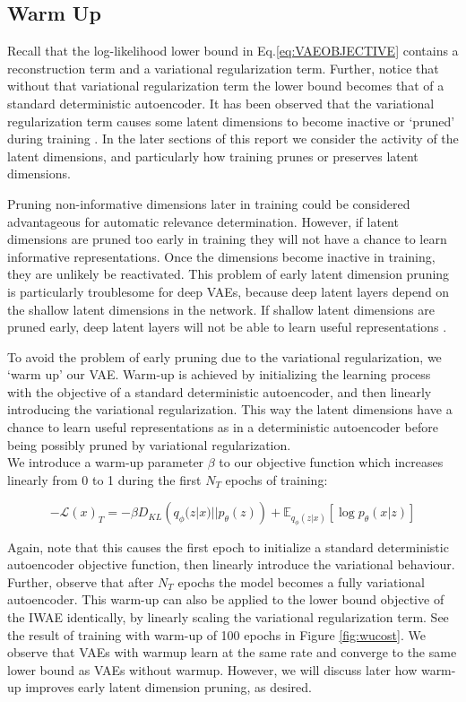 \documentclass{article} %
\numberwithin{figure}{section}
\renewcommand{\L}{\mathcal{L}}
\begin{document}
\subsection{Warm Up}
Recall that the log-likelihood lower bound in Eq.\ref{eq:VAEOBJECTIVE} contains a reconstruction term and a variational regularization term. Further, notice that without that variational regularization term the lower bound becomes that of a standard deterministic autoencoder. It has been observed that the variational regularization term causes some latent dimensions to become inactive or `pruned' during training \cite{MacKay2001, Burda2016}. In the later sections of this report we consider the activity of the latent dimensions, and particularly how training prunes or preserves latent dimensions.
\par Pruning non-informative dimensions later in training could be considered advantageous for automatic relevance determination. However, if latent dimensions are pruned too early in training they will not have a chance to learn informative representations. Once the dimensions become inactive in training, they are unlikely be reactivated. This problem of early latent dimension pruning is particularly troublesome for deep VAEs, because deep latent layers depend on the shallow latent dimensions in the network. If shallow latent dimensions are pruned early,  deep latent layers will not be able to learn useful representations \cite{Sonderby2016}.
\par To avoid the problem of early pruning due to the variational regularization, we `warm up' our VAE. Warm-up is achieved by initializing the learning process with the objective of a standard deterministic autoencoder, and then linearly introducing the variational regularization. This way the latent dimensions have a chance to learn useful representations as in a deterministic autoencoder before being possibly pruned by variational regularization.\\ We introduce a warm-up parameter $\beta$ to our objective function which increases linearly from 0 to 1 during the first $N_T$ epochs of training:

\begin{equation}
    -\L(x)_T=-\beta D_{KL}\left(q_\phi(z|x)||p_\theta(z)\right)+\mathbb{E}_{q_\phi(z|x)}\left[\log{p_\theta(x|z)}\right]
\end{equation}

Again, note that this causes the first epoch to initialize a standard deterministic autoencoder objective function, then linearly introduce the variational behaviour. Further, observe that after $N_T$ epochs the model becomes a fully variational autoencoder. This warm-up can also be applied to the lower bound objective of the IWAE identically, by linearly scaling the variational regularization term. See the result of training with warm-up of 100 epochs in Figure \ref{fig:wucost}. We observe that VAEs with warmup learn at the same rate and converge to the same lower bound as VAEs without warmup. However, we will discuss later how warm-up improves early latent dimension pruning, as desired. 
\end{document}
